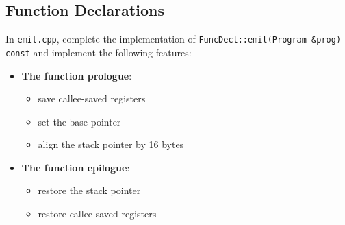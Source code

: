 \documentclass{report}
\begin{document}
	\subsection{Function Declarations}
	In \texttt{emit.cpp}, complete the implementation of \texttt{FuncDecl::emit(Program \&prog) const} and implement the following features:
	\begin{itemize}
		\item \textbf{The function prologue}:
		\begin{itemize}
			\item save callee-saved registers
			\item set the base pointer
			\item align the stack pointer by 16 bytes
		\end{itemize}
		\item \textbf{The function epilogue}:
		\begin{itemize}
			\item restore the stack pointer
			\item restore callee-saved registers
		\end{itemize}
	\end{itemize}
	
 
\end{document}
